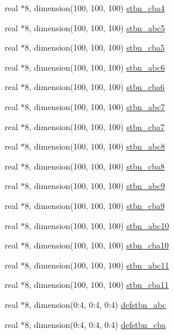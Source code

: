 \begin{DoxyCompactItemize}
real $\ast$8, dimension(100, 100, 100) \hyperlink{classmerck_a0a003faf5f47dd975b8f0799de808088}{stbn\-\_\-cba4}
\item 
real $\ast$8, dimension(100, 100, 100) \hyperlink{classmerck_ac1cdfb5eb8152a98b0f7e19ccde5ad4d}{stbn\-\_\-abc5}
\item 
real $\ast$8, dimension(100, 100, 100) \hyperlink{classmerck_aff2385fd8c779536ba4916db21315237}{stbn\-\_\-cba5}
\item 
real $\ast$8, dimension(100, 100, 100) \hyperlink{classmerck_a90a3118b94446f5d2523da9d4460b6b6}{stbn\-\_\-abc6}
\item 
real $\ast$8, dimension(100, 100, 100) \hyperlink{classmerck_a8768196f4b41bfc312ca8a0f5829da3e}{stbn\-\_\-cba6}
\item 
real $\ast$8, dimension(100, 100, 100) \hyperlink{classmerck_a4e518aa4974e3e9a4a181e3469ec0727}{stbn\-\_\-abc7}
\item 
real $\ast$8, dimension(100, 100, 100) \hyperlink{classmerck_a9f9997b9bb4d573760adc189f3fe7926}{stbn\-\_\-cba7}
\item 
real $\ast$8, dimension(100, 100, 100) \hyperlink{classmerck_a01e392d546665c27adb268047d288cef}{stbn\-\_\-abc8}
\item 
real $\ast$8, dimension(100, 100, 100) \hyperlink{classmerck_a6cba162dae532979a56bbfcc27ead348}{stbn\-\_\-cba8}
\item 
real $\ast$8, dimension(100, 100, 100) \hyperlink{classmerck_aa2388ec2aea5655e7e303755395d1be0}{stbn\-\_\-abc9}
\item 
real $\ast$8, dimension(100, 100, 100) \hyperlink{classmerck_a729100fe8948bce8c2e25f4433c3f69f}{stbn\-\_\-cba9}
\item 
real $\ast$8, dimension(100, 100, 100) \hyperlink{classmerck_a90e51b1533b85851367dfea162630500}{stbn\-\_\-abc10}
\item 
real $\ast$8, dimension(100, 100, 100) \hyperlink{classmerck_ad68a5cfd0ac42b5cbff684365a1f96a5}{stbn\-\_\-cba10}
\item 
real $\ast$8, dimension(100, 100, 100) \hyperlink{classmerck_ac5d13aa927a01400abfe91d6d6104f6c}{stbn\-\_\-abc11}
\item 
real $\ast$8, dimension(100, 100, 100) \hyperlink{classmerck_a599ef328ccf7e65f4f6217c7e80b902c}{stbn\-\_\-cba11}
\item 
real $\ast$8, dimension(0\-:4, 0\-:4, 0\-:4) \hyperlink{classmerck_a1c4ad28622b856dd11f51ffe05e6c324}{defstbn\-\_\-abc}
\item 
real $\ast$8, dimension(0\-:4, 0\-:4, 0\-:4) \hyperlink{classmerck_a9738fd062edaa9f9d1d1330938269a2f}{defstbn\-\_\-cba}

\end{DoxyCompactItemize}
